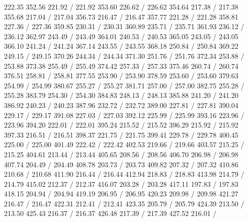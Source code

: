 { 222.35 352.56 221.92 /
 221.92 353.60 226.62 /
 226.62 354.64 217.38 /
 217.38 355.68 217.04 /
 217.04 356.73 216.47 /
 216.47 357.77 221.28 /
 221.28 358.81 227.36 /
 227.36 359.85 230.31 /
 230.31 360.89 235.71 /
 235.71 361.93 236.12 /
 236.12 362.97 243.49 /
 243.49 364.01 240.53 /
 240.53 365.05 243.05 /
 243.05 366.10 241.24 /
 241.24 367.14 243.55 /
 243.55 368.18 250.84 /
 250.84 369.22 249.15 /
 249.15 370.26 244.34 /
 244.34 371.30 251.76 /
 251.76 372.34 253.88 /
 253.88 373.38 255.49 /
 255.49 374.42 257.33 /
 257.33 375.46 260.74 /
 260.74 376.51 258.81 /
 258.81 377.55 253.90 /
 253.90 378.59 253.60 /
 253.60 379.63 254.99 /
 254.99 380.67 255.27 /
 255.27 381.71 257.00 /
 257.00 382.75 255.28 /
 255.28 383.79 254.30 /
 254.30 384.83 248.13 /
 248.13 385.88 241.20 /
 241.20 386.92 240.23 /
 240.23 387.96 232.72 /
 232.72 389.00 227.81 /
 227.81 390.04 229.17 /
 229.17 391.08 227.03 /
 227.03 392.12 225.99 /
 225.99 393.16 223.96 /
 223.96 394.20 222.01 /
 222.01 395.24 215.52 /
 215.52 396.29 215.92 /
 215.92 397.33 216.51 /
 216.51 398.37 221.75 /
 221.75 399.41 229.78 /
 229.78 400.45 225.00 /
 225.00 401.49 222.42 /
 222.42 402.53 219.66 /
 219.66 403.57 215.25 /
 215.25 404.61 213.44 /
 213.44 405.65 208.56 /
 208.56 406.70 206.98 /
 206.98 407.74 204.49 /
 204.49 408.78 203.73 /
 203.73 409.82 207.32 /
 207.32 410.86 210.68 /
 210.68 411.90 216.44 /
 216.44 412.94 218.83 /
 218.83 413.98 214.79 /
 214.79 415.02 212.37 /
 212.37 416.07 203.28 /
 203.28 417.11 197.83 /
 197.83 418.15 204.94 /
 204.94 419.19 206.95 /
 206.95 420.23 209.98 /
 209.98 421.27 216.47 /
 216.47 422.31 212.41 /
 212.41 423.35 205.79 /
 205.79 424.39 213.50 /
 213.50 425.43 216.37 /
 216.37 426.48 217.39 /
 217.39 427.52 216.01 /
}
